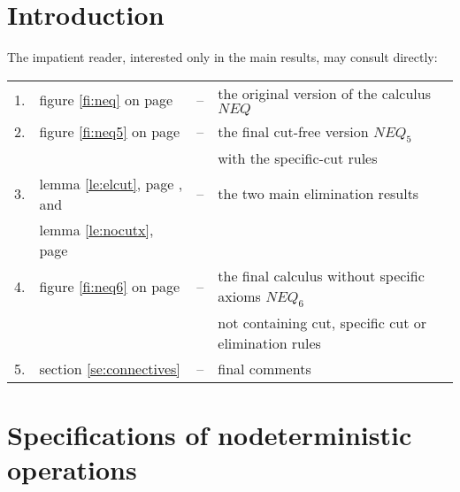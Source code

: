 \section{Introduction}

The impatient reader, interested only in the main results, may consult directly:\\
\begin{tabular}{rlcl}
1. &  figure \ref{fi:neq} on page \pageref{fi:neq} & -- & the original version of
the calculus $NEQ$ \\
2. & figure \ref{fi:neq5} on page \pageref{fi:neq5} & -- & the final cut-free
version $NEQ_5$ \\
 & & & with the specific-cut rules \\
3. & lemma \ref{le:elcut}, page \pageref{le:elcut}, and & -- & the two main elimination results \\
 & lemma \ref{le:nocutx}, page \pageref{le:nocutx} \\
4. & figure \ref{fi:neq6} on page \pageref{fi:neq6} & -- & the final calculus
without specific axioms $NEQ_6$ \\ 
 & & & not containing cut, specific cut or elimination rules \\
5. & section \ref{se:connectives} & -- & final comments
\end{tabular}

\section{Specifications of nodeterministic operations}

